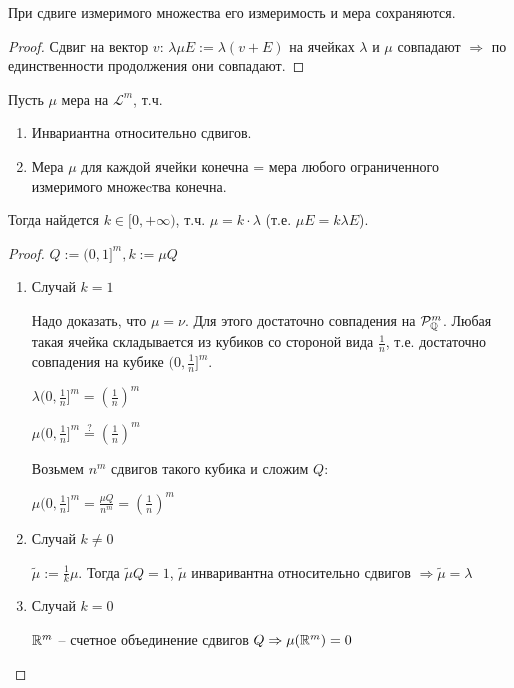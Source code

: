 \begin{theorem}
    При сдвиге измеримого множества его измеримость и мера сохраняются. 
\end{theorem}

\begin{proof}
    Сдвиг на вектор $v$: $\lambda \mu E:=\lambda (v + E)$ на ячейках 
    $\lambda$ и $\mu$ совпадают $\Rightarrow$ по единственности продолжения они совпадают.
\end{proof}

\begin{theorem}
    Пусть $\mu$ мера на $\mathcal{L}^m$, т.ч.

    \begin{enumerate}
        \item Инвариантна относительно сдвигов.
        \item Мера $\mu$ для каждой ячейки конечна = мера любого ограниченного измеримого множеcтва конечна.
    \end{enumerate}

    Тогда найдется $k\in [0, +\infty)$, т.ч. $\mu = k\cdot \lambda$ (т.е. $\mu E = k\lambda E$).
\end{theorem}

\begin{proof}
    $Q:= (0, 1]^m, k := \mu Q$

    \begin{enumerate}
        \item Случай $k=1$
        
        Надо доказать, что $\mu =\nu$. Для этого достаточно совпадения на $\mathcal{P}^m_{\mathbb{Q}}$.
        Любая такая ячейка складывается из кубиков со стороной вида $\frac{1}{n}$, т.е. достаточно 
        совпадения на кубике $(0, \frac{1}{n}]^m$.

        $\lambda (0, \frac{1}{n}]^m= (\frac{1}{n})^m$

        $\mu (0, \frac{1}{n}]^m\overset{?}{=} (\frac{1}{n})^m$

        Возьмем $n^m$ сдвигов такого кубика и сложим $Q$:

        $\mu (0, \frac{1}{n}]^m= \frac{\mu Q}{n^m}=(\frac{1}{n})^m$

        \item Случай $k\not = 0$
        
        $\tilde{\mu}:=\frac{1}{k}\mu$. Тогда $\tilde{\mu} Q=1$, $\tilde{\mu}$ инваривантна
        относительно сдвигов $\Rightarrow\tilde{\mu}=\lambda$

        \item Случай $k = 0$
        
        $\mathbb{R}^m$ – счетное объединение сдвигов $Q\Rightarrow\mu (\mathbb{R}^m)=0$
    \end{enumerate}
\end{proof}

